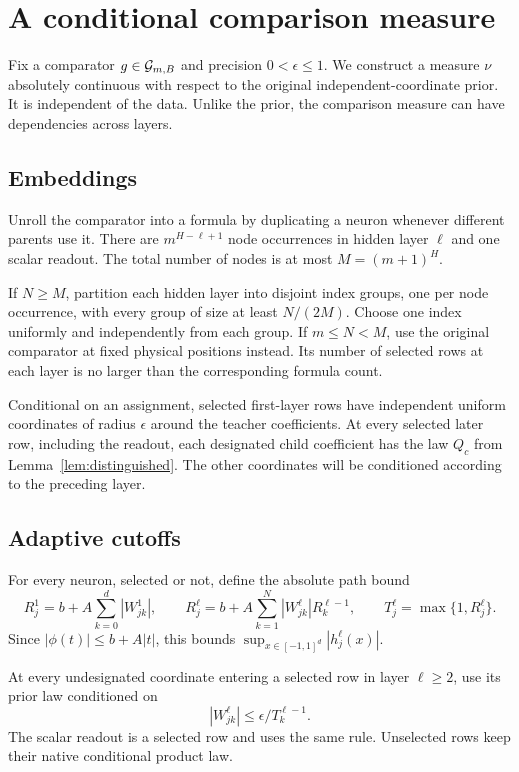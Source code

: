 \section{A conditional comparison measure}
\label{sec:comparison}
Fix a comparator $g\in\mathcal G_{m,B}$ and precision $0<\epsilon\le1$. We construct a measure $\nu$ absolutely continuous with respect to the original independent-coordinate prior. It is independent of the data. Unlike the prior, the comparison measure can have dependencies across layers.

\subsection{Embeddings}
Unroll the comparator into a formula by duplicating a neuron whenever different parents use it. There are $m^{H-\ell+1}$ node occurrences in hidden layer $\ell$ and one scalar readout. The total number of nodes is at most $M=(m+1)^H$.

If $N\ge M$, partition each hidden layer into disjoint index groups, one per node occurrence, with every group of size at least $N/(2M)$. Choose one index uniformly and independently from each group. If $m\le N<M$, use the original comparator at fixed physical positions instead. Its number of selected rows at each layer is no larger than the corresponding formula count.

Conditional on an assignment, selected first-layer rows have independent uniform coordinates of radius $\epsilon$ around the teacher coefficients. At every selected later row, including the readout, each designated child coefficient has the law $Q_c$ from Lemma~\ref{lem:distinguished}. The other coordinates will be conditioned according to the preceding layer.

\subsection{Adaptive cutoffs}
For every neuron, selected or not, define the absolute path bound
\begin{equation}
 R_j^1=b+A\sum_{k=0}^d|W_{jk}^1|,\qquad
 R_j^\ell=b+A\sum_{k=1}^N|W_{jk}^\ell|R_k^{\ell-1},
 \qquad T_j^\ell=\max\{1,R_j^\ell\}.
 \label{eq:path-bound}
\end{equation}
Since $|\phi(t)|\le b+A|t|$, this bounds $\sup_{x\in[-1,1]^d}|h_j^\ell(x)|$.

At every undesignated coordinate entering a selected row in layer $\ell\ge2$, use its prior law conditioned on
\begin{equation}
 |W_{jk}^\ell|\le\epsilon/T_k^{\ell-1}.
 \label{eq:adaptive-cutoff}
\end{equation}
The scalar readout is a selected row and uses the same rule. Unselected rows keep their native conditional product law.

